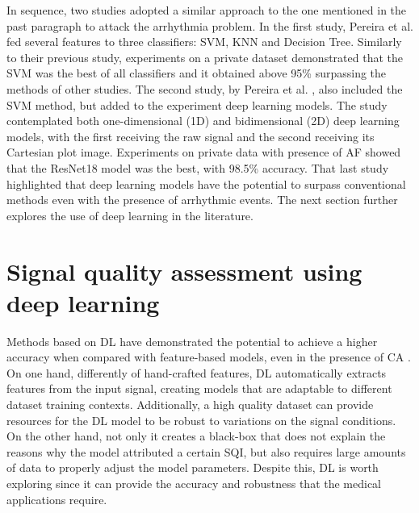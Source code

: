 In sequence, two studies adopted a similar approach to the one mentioned in the past paragraph to attack the arrhythmia problem. In the first study, Pereira et al. \cite{arrhythmia-3} fed several features to three classifiers: \gls{SVM}, \gls{KNN} and Decision Tree. Similarly to their previous study, experiments on a private dataset demonstrated that the \gls{SVM} was the best of all classifiers and it obtained above 95\% surpassing the methods of other studies. The second study, by Pereira et al. \cite{arrhythmia-4}, also included the \gls{SVM} method, but added to the experiment deep learning models. The study contemplated both one-dimensional (1D) and bidimensional (2D) deep learning models, with the first receiving the raw signal and the second receiving its Cartesian plot image. Experiments on private data with presence of \gls{AF} showed that the ResNet18 model was the best, with 98.5\% accuracy. That last study highlighted that deep learning models have the potential to surpass conventional methods even with the presence of arrhythmic events. The next section further explores the use of deep learning in the literature.  

\section{Signal quality assessment using deep learning}
\label{sec:deep_learning}

Methods based on \gls{DL} have demonstrated the potential to achieve a higher accuracy when compared with feature-based models, even in the presence of \gls{CA} \cite{arrhythmia-3}. On one hand, differently of hand-crafted features, \gls{DL} automatically extracts features from the input signal, creating models that are adaptable to different dataset training contexts. Additionally, a high quality dataset can provide resources for the \gls{DL} model to be robust to variations on the signal conditions. On the other hand, not only it creates a black-box that does not explain the reasons why the model attributed a certain \gls{SQI}, but also requires large amounts of data to properly adjust the model parameters. Despite this, \gls{DL} is worth exploring since it can provide the accuracy and robustness that the medical applications require. 

